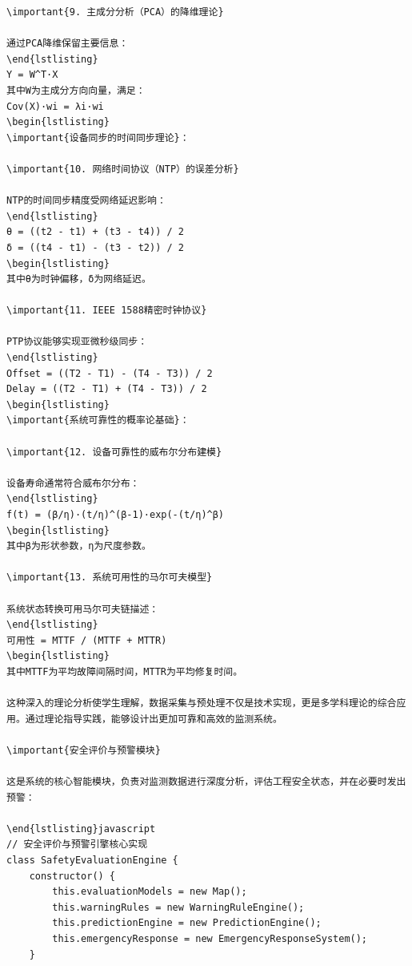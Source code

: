 \begin{verbatim}
\important{9. 主成分分析（PCA）的降维理论}

通过PCA降维保留主要信息：
\end{lstlisting}
Y = W^T·X
其中W为主成分方向向量，满足：
Cov(X)·wi = λi·wi
\begin{lstlisting}
\important{设备同步的时间同步理论}：

\important{10. 网络时间协议（NTP）的误差分析}

NTP的时间同步精度受网络延迟影响：
\end{lstlisting}
θ = ((t2 - t1) + (t3 - t4)) / 2
δ = ((t4 - t1) - (t3 - t2)) / 2
\begin{lstlisting}
其中θ为时钟偏移，δ为网络延迟。

\important{11. IEEE 1588精密时钟协议}

PTP协议能够实现亚微秒级同步：
\end{lstlisting}
Offset = ((T2 - T1) - (T4 - T3)) / 2
Delay = ((T2 - T1) + (T4 - T3)) / 2
\begin{lstlisting}
\important{系统可靠性的概率论基础}：

\important{12. 设备可靠性的威布尔分布建模}

设备寿命通常符合威布尔分布：
\end{lstlisting}
f(t) = (β/η)·(t/η)^(β-1)·exp(-(t/η)^β)
\begin{lstlisting}
其中β为形状参数，η为尺度参数。

\important{13. 系统可用性的马尔可夫模型}

系统状态转换可用马尔可夫链描述：
\end{lstlisting}
可用性 = MTTF / (MTTF + MTTR)
\begin{lstlisting}
其中MTTF为平均故障间隔时间，MTTR为平均修复时间。

这种深入的理论分析使学生理解，数据采集与预处理不仅是技术实现，更是多学科理论的综合应用。通过理论指导实践，能够设计出更加可靠和高效的监测系统。

\important{安全评价与预警模块}

这是系统的核心智能模块，负责对监测数据进行深度分析，评估工程安全状态，并在必要时发出预警：

\end{lstlisting}javascript
// 安全评价与预警引擎核心实现
class SafetyEvaluationEngine {
    constructor() {
        this.evaluationModels = new Map();
        this.warningRules = new WarningRuleEngine();
        this.predictionEngine = new PredictionEngine();
        this.emergencyResponse = new EmergencyResponseSystem();
    }
    

\end{verbatim}
